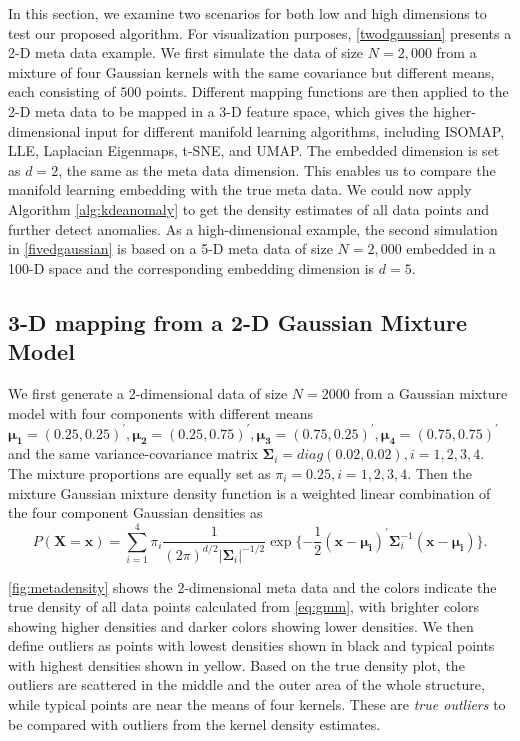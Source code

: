 \documentclass[11pt,a4paper,]{article}
\begin{document}
In this section, we examine two scenarios for both low and high dimensions to test our proposed algorithm. For visualization purposes, \autoref{twodgaussian} presents a 2-D meta data example. We first simulate the data of size \(N=2,000\) from a mixture of four Gaussian kernels with the same covariance but different means, each consisting of \(500\) points. Different mapping functions are then applied to the 2-D meta data to be mapped in a 3-D feature space, which gives the higher-dimensional input for different manifold learning algorithms, including ISOMAP, LLE, Laplacian Eigenmaps, t-SNE, and UMAP. The embedded dimension is set as \(d=2\), the same as the meta data dimension.
This enables us to compare the manifold learning embedding with the true meta data. We could now apply Algorithm \ref{alg:kdeanomaly} to get the density estimates of all data points and further detect anomalies. As a high-dimensional example, the second simulation in \autoref{fivedgaussian} is based on a 5-D meta data of size \(N=2,000\) embedded in a 100-D space and the corresponding embedding dimension is \(d=5\).

\hypertarget{twodgaussian}{%
\subsection{3-D mapping from a 2-D Gaussian Mixture Model}\label{twodgaussian}}

We first generate a 2-dimensional data of size \(N=2000\) from a Gaussian mixture model with four components with different means
\(\pmb{\mu_1}=(0.25, 0.25)^\prime, \pmb{\mu_2}=(0.25, 0.75)^\prime, \pmb{\mu_3}=(0.75, 0.25)^\prime, \pmb{\mu_4}=(0.75, 0.75)^\prime\) and the same variance-covariance matrix \(\pmb{\Sigma}_i=diag(0.02, 0.02), i=1,2,3,4\). The mixture proportions
are equally set as \(\pi_i=0.25, i=1,2,3,4\).
Then the mixture Gaussian mixture density function is a weighted linear combination of the four component Gaussian densities as
\begin{equation}
\label{eq:gmm}
P(\pmb{X}=\pmb{x}) = \sum_{i=1}^{4}\pi_i \frac{1}{(2\pi)^{d/2}|\pmb{\Sigma}_i|^{-1/2}} \exp{\{-\frac{1}{2} (\pmb{x}-\pmb{\mu_i})^\prime \pmb{\Sigma}_i^{-1} (\pmb{x}-\pmb{\mu_i}) \}}.
\end{equation}

\autoref{fig:metadensity} shows the 2-dimensional meta data and the colors indicate the true density of all data points calculated from \eqref{eq:gmm}, with brighter colors showing higher densities and darker colors showing lower densities. We then define outliers as points with lowest densities shown in black and typical points with highest densities shown in yellow. Based on the true density plot, the outliers are scattered in the middle and the outer area of the whole structure, while typical points are near the means of four kernels. These are \emph{true outliers} to be compared with outliers from the
kernel density estimates.
\end{document}
